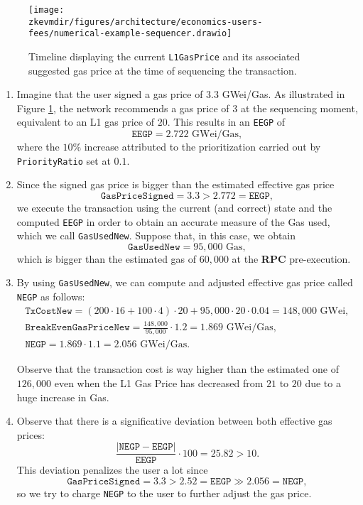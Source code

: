 \begin{figure}[H]
\centering
\texttt{[image: \\zkevmdir/figures/architecture/economics-users-fees/numerical-example-sequencer.drawio]}
\caption{Timeline displaying the current \texttt{L1GasPrice} and its associated suggested gas price at the time of sequencing the transaction. }
\label{fig:numerical-example-sequencer}
\end{figure}


\begin{enumerate}

\item Imagine that the user signed a gas price of $3.3$ GWei/Gas. As illustrated in Figure \ref{fig:numerical-example-sequencer}, the network recommends a gas price of $3$ at the sequencing moment, equivalent to an L1 gas price of $20$. This results in an \texttt{EEGP} of
\[
\texttt{EEGP} = 2.722 \text{ GWei/Gas},
\]
where the $10$\% increase attributed to the prioritization carried out by \texttt{PriorityRatio} set at $0.1$.

\item Since the signed gas price is bigger than the estimated effective gas price
\[
\texttt{GasPriceSigned} = 3.3 > 2.772 = \texttt{EEGP},
\]
we execute the transaction using the current (and correct) state and the computed \texttt{EEGP} in order to obtain an accurate measure of the Gas used, which we call \texttt{GasUsedNew}. Suppose that, in this case, we obtain
\[
\texttt{GasUsedNew} = 95,000 \text{ Gas},
\]
which is bigger than the estimated gas of $60,000$ at the \textbf{RPC} pre-execution.

\item By using \texttt{GasUsedNew}, we can compute and adjusted effective gas price called \texttt{NEGP} as follows:
\begin{gather*}
\texttt{TxCostNew} = (200 \cdot 16 + 100 \cdot 4) \cdot 20 + 95,000 \cdot 20 \cdot 0.04 = 148,000 \text{ GWei}, \\
\texttt{BreakEvenGasPriceNew} = \frac{148,000}{95,000} \cdot 1.2 = 1.869 \text{ GWei/Gas}, \\
\texttt{NEGP} = 1.869 \cdot 1.1 = 2.056 \text{ GWei/Gas}.
\end{gather*}

Observe that the transaction cost is way higher than the estimated one of $126,000$ even when the L1 Gas Price has decreased from $21$ to $20$ due to a huge increase in Gas.

\item Observe that there is a significative deviation between both effective gas prices:
\[
\frac{\vert \texttt{NEGP} - \texttt{EEGP} \vert}{\texttt{EEGP}} \cdot 100 = 25.82 > 10.
\]
This deviation penalizes the user a lot since
\[
\texttt{GasPriceSigned} = 3.3 > 2.52 = \texttt{EEGP} \gg 2.056 = \texttt{NEGP},
\]
so we try to charge \texttt{NEGP} to the user to further adjust the gas price.


\end{enumerate}
